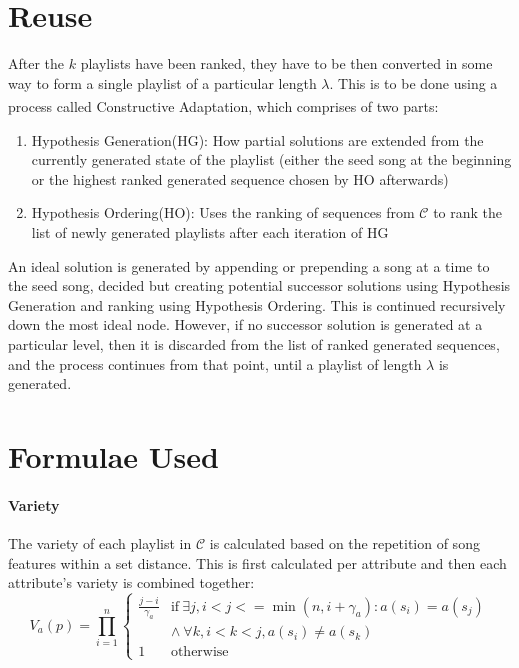 \documentclass[a4paper, 12pt]{report}
\begin{document}
\section{Reuse}
After the \(k\) playlists have been ranked, they have to be then converted in some way to form a single playlist of a particular length \(\lambda\). 
This is to be done using a process called Constructive Adaptation\textsuperscript{\cite{constructive-adaptation}}, which comprises of two parts:
\begin{enumerate}
    \item Hypothesis Generation(HG): How partial solutions are extended from the currently generated state of the playlist 
    (either the seed song at the beginning or the highest ranked generated sequence chosen by HO afterwards)
    \item Hypothesis Ordering(HO): Uses the ranking of sequences from \(\mathcal{C}\) to rank the list of newly generated playlists after each iteration of HG
\end{enumerate}
An ideal solution is generated by appending or prepending a song at a time to the seed song, decided but creating potential successor 
solutions using Hypothesis Generation and ranking using Hypothesis Ordering. 
This is continued recursively down the most ideal node. However, if no successor solution is generated at a particular level, then it is discarded from the 
list of ranked generated sequences, and the process continues from that point, until a playlist of length \(\lambda\) is generated.

\section{Formulae Used\textsuperscript{\cite[pp. 5--10]{main}}}
\paragraph{Variety}
The variety of each playlist in \(\mathcal{C}\) is calculated based on the repetition of song features within a set distance. 
This is first calculated per attribute and then each attribute's variety is combined together:
\begin{equation}
V_a(p) = \prod_{i=1}^n
\begin{cases}
    \frac{j-i}{\gamma_a} & \text{if}\ \exists j, i < j <= \min(n, i+\gamma_a) : a(s_i) = a(s_j) \\
    & \wedge\ \forall k, i < k < j, a(s_i) \neq a(s_k) \\
    1 & \text{otherwise}
\end{cases}
\end{equation}
\end{document}
